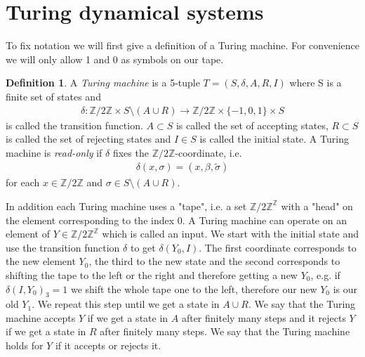\documentclass[12pt,a4paper]{scrartcl}
\theoremstyle{plain}
\theoremstyle{definition}
\newtheorem{Definition}[Theorem]{Definition}
\numberwithin{equation}{section}
\newcommand{\Z}{\mathbb{Z}} %
\newcommand{\2}{\mathbb{Z} / 2 \mathbb{Z}}
\newcommand{\1}{\bar{1}}
\newcommand{\0}{\bar{0}}
\begin{document}
\section{Turing dynamical systems}
To fix notation we will first give a definition of a Turing machine. For convenience we will only allow 1 and 0 as symbols on our tape.
\begin{Definition}
	A \emph{Turing machine} is a 5-tuple $T=(S,\delta, A, R, I)$ where S is a finite set of states and 
	\begin{align*}
		\delta: \2 \times S \setminus(A \cup R) \to \2 \times \{-1, 0, 1\} \times S
	\end{align*}
	is called the transition function. $A \subset S$ is called the set of accepting states, $R \subset S$ is called the set of rejecting states and $I \in S$ is called the initial state.
	A Turing machine is \emph{read-only} if $\delta$ fixes the $\2$-coordinate, i.e.
	\begin{align*}
		\delta (x, \sigma) = (x, \beta, \tilde{\sigma})
	\end{align*}
	for each $x \in \2$ and $\sigma \in S \setminus(A \cup R)$.
\end{Definition}
In addition each Turing machine uses a "tape", i.e. a set $\Z / 2\Z ^{\Z}$ with a "head" on the element corresponding to the index 0. A Turing machine can operate on an element of $Y \in \Z / 2\Z ^{\Z}$ which is called an input. We start with the initial state and use the transition function $\delta$ to get $\delta(Y_0, I)$. The first coordinate corresponds to the new element $Y_0$, the third to the new state and the second corresponds to shifting the tape to the left or the right and therefore getting a new $Y_0$, e.g. if $\delta(I, Y_0)_3 = 1$ we shift the whole tape one to the left, therefore our new $Y_0$ is our old $Y_1$. We repeat this step until we get a state in $A \cup R$. We say that the Turing machine accepts $Y$ if we get a state in $A$ after finitely many steps and it rejects $Y$ if we get a state in $R$ after finitely many steps. We say that the Turing machine holds for $Y$ if it accepts or rejects it.
\end{document}
